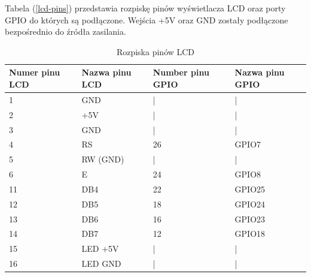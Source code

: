 \documentclass[11pt,a4paper, twoside]{article}
\begin{document}
Tabela (\ref{lcd-pins}) przedstawia rozpiskę pinów wyświetlacza LCD oraz porty GPIO do których są podłączone. Wejścia +5V oraz GND zostały podłączone bezpośrednio do źródła zasilania.
\begin{table}[H]
\begin{center}
\begin{tabular}{ | l | l | l | l | }
\hline
Numer pinu LCD & Nazwa pinu LCD & Number pinu GPIO & Nazwa pinu GPIO \\ \hline
1 & GND & | &  | \\ \hline
2 & +5V & | &  | \\ \hline
3 & GND & | &  | \\ \hline
4 & RS &  26 & GPIO7 \\ \hline
5 & RW (GND) & | & | \\ \hline 
6 & E & 24 & GPIO8 \\ \hline
11 & DB4 & 22 & GPIO25 \\ \hline
12 & DB5 & 18 & GPIO24 \\ \hline
13 & DB6 & 16 & GPIO23 \\ \hline
14 & DB7 & 12 & GPIO18 \\ \hline
15 & LED +5V & | & | \\ \hline
16 & LED GND & | & | \\ \hline
\end{tabular}
\end{center}
\caption{Rozpiska pinów LCD}
$\label{lcd-pins}$
\end{table}
\end{document}
